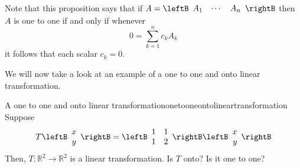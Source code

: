 Note that this proposition says that if $A=\leftB
\begin{array}{ccc}
A_{1} & \cdots & A_{n}
\end{array}
\rightB $ then $A$ is one to one if and only if whenever
\begin{equation*}
0 = \sum_{k=1}^{n}c_{k}A_{k}
\end{equation*}
it follows that each scalar $c_{k}=0$. 

We will now take a look at an example of a one to one and onto linear transformation. 

\begin{example}{A one to one and onto linear transformation}{onetooneontolineartransformation}
Suppose
\begin{equation*}
T\leftB
\begin{array}{c}
x \\
y
\end{array}
\rightB =\leftB
\begin{array}{rr}
1 & 1 \\
1 & 2
\end{array}
\rightB \leftB
\begin{array}{r}
x \\
y
\end{array}
\rightB
\end{equation*}
Then, $T:\mathbb{R}^{2}\rightarrow \mathbb{R}^{2}$ is a linear
transformation. Is $T$ onto? Is it one to one?
\end{example}

